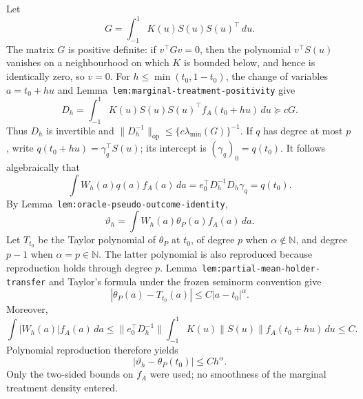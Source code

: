 Let
\[
G=\int_{-1}^1K(u)S(u)S(u)^\top\,du.
\]
The matrix \(G\) is positive definite: if \(v^\top Gv=0\), then the polynomial \(v^\top S(u)\) vanishes on a neighbourhood on which \(K\) is bounded below, and hence is identically zero, so \(v=0\). For \(h\le\min(t_0,1-t_0)\), the change of variables \(a=t_0+hu\) and Lemma~\texttt{lem:marginal-treatment-positivity} give
\[
D_h=
\int_{-1}^1K(u)S(u)S(u)^\top f_A(t_0+hu)\,du
\succeq cG.
\]
Thus \(D_h\) is invertible and \(\|D_h^{-1}\|_{\mathrm{op}}\le\{c\lambda_{\min}(G)\}^{-1}\). If \(q\) has degree at most \(p\), write \(q(t_0+hu)=\gamma_q^\top S(u)\); its intercept is \((\gamma_q)_0=q(t_0)\). It follows algebraically that
\[
\int W_h(a)q(a)f_A(a)\,da
=e_0^\top D_h^{-1}D_h\gamma_q
=q(t_0).
\]
By Lemma~\texttt{lem:oracle-pseudo-outcome-identity},
\[
\vartheta_h=
\int W_h(a)\theta_P(a)f_A(a)\,da.
\]
Let \(T_{t_0}\) be the Taylor polynomial of \(\theta_P\) at \(t_0\), of degree \(p\) when \(\alpha\notin\mathbb N\), and degree \(p-1\) when \(\alpha=p\in\mathbb N\). The latter polynomial is also reproduced because reproduction holds through degree \(p\). Lemma~\texttt{lem:partial-mean-holder-transfer} and Taylor's formula under the frozen seminorm convention give
\[
|\theta_P(a)-T_{t_0}(a)|
\le C|a-t_0|^\alpha.
\]
Moreover,
\[
\int|W_h(a)|f_A(a)\,da
\le
\|e_0^\top D_h^{-1}\|
\int_{-1}^1K(u)\|S(u)\|f_A(t_0+hu)\,du
\le C.
\]
Polynomial reproduction therefore yields
\[
|\vartheta_h-\theta_P(t_0)|
\le Ch^\alpha.
\]
Only the two-sided bounds on \(f_A\) were used; no smoothness of the marginal treatment density entered.